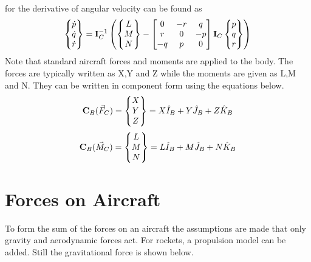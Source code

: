 \documentclass{article}
\begin{document}
for the derivative of angular velocity can be found as
\begin{equation}\label{e:pqrdot} 
\begin{Bmatrix} \dot{p} \\ \dot{q} \\ \dot{r} \end{Bmatrix} = {\bf I}_C^{-1}\left(
\begin{Bmatrix} L\\M\\N\end{Bmatrix}-\begin{bmatrix} 0 & -r
& q \\ r & 0 & -p \\ -q & p & 0 \end{bmatrix} {\bf I}_C\begin{Bmatrix} p\\q\\r\end{Bmatrix}\right)
\end{equation}
Note that standard aircraft forces and moments are applied to the
body. The forces are typically written as X,Y and Z while the moments
are given as L,M and N. They can be written in component form using
the equations below.
\begin{equation}
{\bf C}_B(\vec{F}_{C}) = \begin{Bmatrix} X \\ Y
  \\ Z \end{Bmatrix} = X \hat{I}_B + Y \hat{J}_B + Z \hat{K}_B
\end{equation}
\begin{equation}
{\bf C}_B(\vec{M}_{C}) = \begin{Bmatrix} L \\ M
  \\ N \end{Bmatrix} = L \hat{I}_B + M \hat{J}_B + N \hat{K}_B
\end{equation}

\section{Forces on Aircraft}
To form the sum of the forces on an aircraft the assumptions are made
that only gravity and aerodynamic forces act. For rockets, a
propulsion model can be added. Still the gravitational force is shown
below. 
\end{document}
